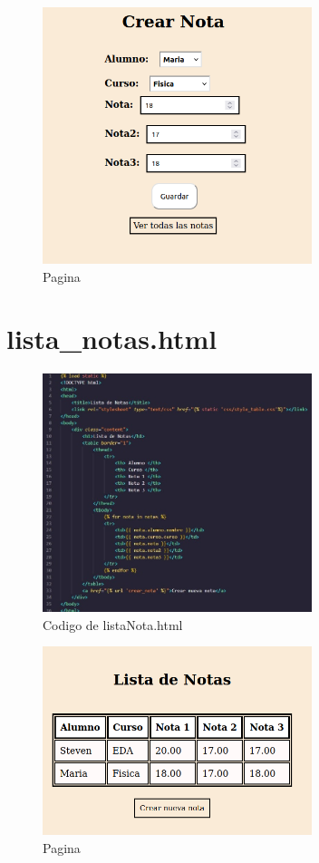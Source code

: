 \documentclass[10pt, a4paper]{article}
\begin{document}
\begin{figure}[H]
  \centering
  \includegraphics[width=0.7\textwidth]{img/CrearNota.png}
  \caption{Pagina}
\end{figure}
 

\section{lista\_notas.html }
\begin{figure}[H]
  \centering
  \includegraphics[width=0.7\textwidth]{img/imagen12.jpeg}
  \caption{Codigo de listaNota.html}
\end{figure} 

\begin{figure}[H]
  \centering
  \includegraphics[width=0.7\textwidth]{img/ListaNotas.png}
  \caption{Pagina}
\end{figure}
\end{document}
